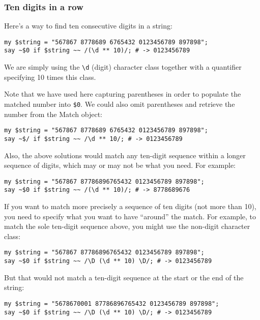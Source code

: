 \subsubsection{Ten digits in a row}

Here's a way to find ten consecutive digits in a string:

\begin{verbatim}
my $string = "567867 8778689 6765432 0123456789 897898";
say ~$0 if $string ~~ /(\d ** 10)/; # -> 0123456789
\end{verbatim}

We are simply using the \verb'\d' (digit) character class 
together with a quantifier specifying 10 times this class.

Note that we have used here capturing parentheses in order 
to populate the matched number into \verb'$0'. We could also 
omit parentheses and retrieve the number from the Match object:


\begin{verbatim}
my $string = "567867 8778689 6765432 0123456789 897898";
say ~$/ if $string ~~ /\d ** 10/; # -> 0123456789
\end{verbatim}
%

Also, the above solutions would match any ten-digit sequence 
within a longer sequence of digits, which may or may not 
be what you need. For example:

\begin{verbatim}
my $string = "567867 87786896765432 0123456789 897898";
say ~$0 if $string ~~ /(\d ** 10)/; # -> 8778689676
\end{verbatim}

If you want to match more precisely a sequence of ten 
digits (not more than 10), you need to specify what you 
want to have ``around'' the match. For example, to 
match the sole ten-digit sequence above, you might use 
the non-digit character class:

\begin{verbatim}
my $string = "567867 87786896765432 0123456789 897898";
say ~$0 if $string ~~ /\D (\d ** 10) \D/; # -> 0123456789
\end{verbatim}

But that would not match a ten-digit sequence at the start 
or the end of the string:

\begin{verbatim}
my $string = "5678670001 87786896765432 0123456789 897898";
say ~$0 if $string ~~ /\D (\d ** 10) \D/; # -> 0123456789
\end{verbatim}


